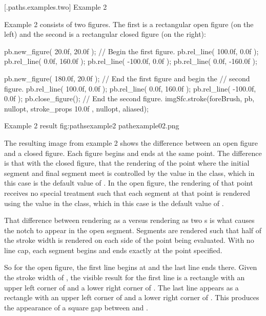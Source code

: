  [\iotwod.paths.examples.two] {Example 2}

\pnum
Example 2 consists of two figures. The first is a rectangular open figure (on the left) and the second is a rectangular closed figure (on the right):

\begin{codeblock}
  pb.new_figure({ 20.0f, 20.0f }); // Begin the first figure.
  pb.rel_line({ 100.0f, 0.0f });
  pb.rel_line({ 0.0f, 160.0f });
  pb.rel_line({ -100.0f, 0.0f });
  pb.rel_line({ 0.0f, -160.0f });
  
  pb.new_figure({ 180.0f, 20.0f }); // End the first figure and begin the 
                                    // second figure.
  pb.rel_line({ 100.0f, 0.0f });
  pb.rel_line({ 0.0f, 160.0f });
  pb.rel_line({ -100.0f, 0.0f });
  pb.close_figure(); // End the second figure.
  imgSfc.stroke(foreBrush, pb, nullopt, stroke_props{ 10.0f }, nullopt, 
    aliased);
\end{codeblock}

\begin{importgraphiciotwod}
{Example 2 result}
{fig:pathsexample2}
{pathexample02.png}
\end{importgraphiciotwod}

\FloatBarrier

\pnum
The resulting image from example 2 shows the difference between an open figure and a closed figure. Each figure begins and ends at the same point. The difference is that with the closed figure, that the rendering of the point where the initial segment and final segment meet is controlled by the  value in the  class, which in this case is the default value of . In the open figure, the rendering of that point receives no special treatment such that each segment at that point is rendered using the  value in the  class, which in this case is the default value of .

\pnum
That difference between rendering as a  versus rendering as two s is what causes the notch to appear in the open segment. Segments are rendered such that half of the stroke width is rendered on each side of the point being evaluated. With no line cap, each segment begins and ends exactly at the point specified.

\pnum
So for the open figure, the first line begins at  and the last line ends there. Given the stroke width of , the visible result for the first line is a rectangle with an upper left corner of  and a lower right corner of . The last line appears as a rectangle with an upper left corner of  and a lower right corner of . This produces the appearance of a square gap between  and .

